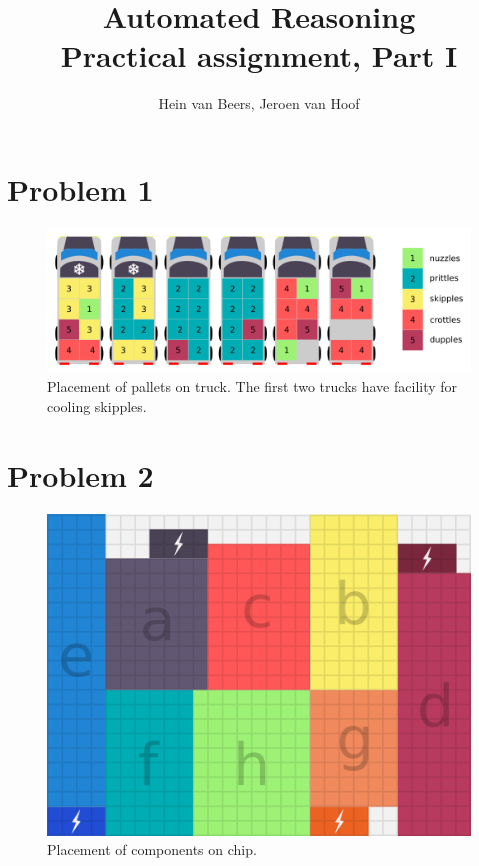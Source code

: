 \documentclass[a4paper]{article}
\author{Hein van Beers, Jeroen van Hoof}
\title{Automated Reasoning\\
	 \large Practical assignment, Part I}
\begin{document}
	\maketitle
	
	\section{Problem 1}
		\begin{figure}[H]
			\centering
				\includegraphics[scale=1]{trucks.png}
			\caption{Placement of pallets on truck. The first two trucks have facility for cooling skipples.}
		\end{figure}
	\section{Problem 2}
	\begin{figure}[H]
		\centering
			\includegraphics[scale=0.5]{power-grid.png}
		\caption{Placement of components on chip.}
	\end{figure}
\end{document}
